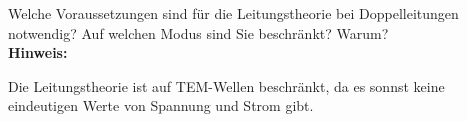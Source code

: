 \begin{question}[section=5,subsection=53,name={Leitungstheorie},difficulty=9,type=mdl,tags={}]
	Welche Voraussetzungen sind für die Leitungstheorie bei Doppelleitungen notwendig? Auf welchen Modus sind Sie beschränkt? Warum?
	\\ \textbf{Hinweis:}\\
	
\end{question}
\begin{solution}
	Die Leitungstheorie ist auf TEM-Wellen beschränkt, da es sonnst keine eindeutigen Werte von Spannung und Strom gibt.
\end{solution}